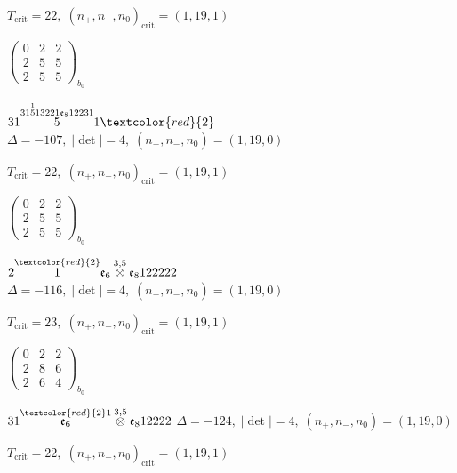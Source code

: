 \documentclass[10pt]{article}
\begin{document}
\hspace{1em}$T_{\text{crit}}=22,\; (n_+,n_-,n_0)_{\text{crit}}=(1,19,1)$

\hspace{2em}$\left(\begin{smallmatrix}0 & 2 & 2 \\ 2 & 5 & 5 \\ 2 & 5 & 5\end{smallmatrix}\right)_{\!b_0}$

\smallskip

$31\overset{31\overset{1}{5}13221\mathfrak{e}_812231}{5}1\textcolor{red}{2}$ \quad $\Delta=-107,\; |\det|=4,\; (n_+,n_-,n_0)=(1,19,0)$

\hspace{1em}$T_{\text{crit}}=22,\; (n_+,n_-,n_0)_{\text{crit}}=(1,19,1)$

\hspace{2em}$\left(\begin{smallmatrix}0 & 2 & 2 \\ 2 & 5 & 5 \\ 2 & 5 & 5\end{smallmatrix}\right)_{\!b_0}$

\smallskip

$2\overset{\textcolor{red}{2}}{1}\mathfrak{e}_6\overset{3,5}{\otimes}\mathfrak{e}_8122222$ \quad $\Delta=-116,\; |\det|=4,\; (n_+,n_-,n_0)=(1,19,0)$

\hspace{1em}$T_{\text{crit}}=23,\; (n_+,n_-,n_0)_{\text{crit}}=(1,19,1)$

\hspace{2em}$\left(\begin{smallmatrix}0 & 2 & 2 \\ 2 & 8 & 6 \\ 2 & 6 & 4\end{smallmatrix}\right)_{\!b_0}$

\smallskip

$31\overset{\textcolor{red}{2}1}{\mathfrak{e}_6}\overset{3,5}{\otimes}\mathfrak{e}_812222$ \quad $\Delta=-124,\; |\det|=4,\; (n_+,n_-,n_0)=(1,19,0)$

\hspace{1em}$T_{\text{crit}}=22,\; (n_+,n_-,n_0)_{\text{crit}}=(1,19,1)$
\end{document}
